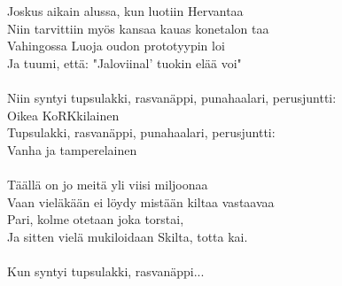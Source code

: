 
            Joskus aikain alussa, kun luotiin Hervantaa \\
            Niin tarvittiin myös kansaa kauas konetalon taa \\
            Vahingossa Luoja oudon prototyypin loi \\
            Ja tuumi, että: "Jaloviinal' tuokin elää voi" \\
\hspace{10mm} \\
            Niin syntyi tupsulakki, rasvanäppi, punahaalari, perusjuntti: \\
            Oikea KoRKkilainen \\
            Tupsulakki, rasvanäppi, punahaalari, perusjuntti: \\
            Vanha ja tamperelainen \\
\hspace{10mm} \\
            Täällä on jo meitä yli viisi miljoonaa \\
            Vaan vieläkään ei löydy mistään kiltaa vastaavaa \\
            Pari, kolme otetaan joka torstai, \\
            Ja sitten vielä mukiloidaan Skilta, totta kai. \\
\hspace{10mm} \\
            Kun syntyi tupsulakki, rasvanäppi... \\
